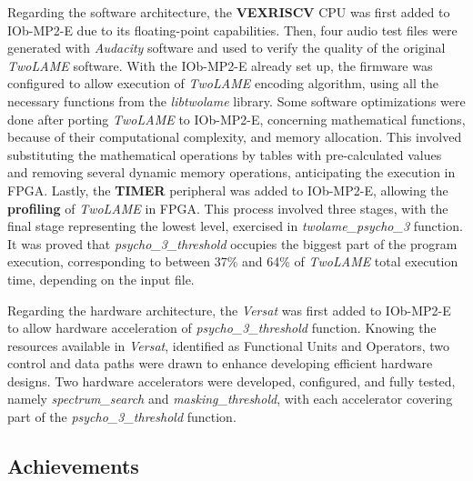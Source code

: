 Regarding the software architecture, the \textbf{VEXRISCV} CPU was first added to IOb-MP2-E due to its floating-point capabilities. Then, four audio test files were generated with \textit{Audacity} software and used to verify the quality of the original \textit{TwoLAME} software. 
With the IOb-MP2-E already set up, the firmware was configured to allow execution of \textit{TwoLAME} encoding algorithm, using all the necessary functions from the \textit{libtwolame} library. 
Some software optimizations were done after porting \textit{TwoLAME} to IOb-MP2-E, concerning mathematical functions, because of their computational complexity, and memory allocation. This involved substituting the mathematical operations by tables with pre-calculated values and removing several dynamic memory operations, anticipating the execution in FPGA. 
Lastly, the \textbf{TIMER} peripheral was added to IOb-MP2-E, allowing the \textbf{profiling} of \textit{TwoLAME} in FPGA. This process involved three stages, with the final stage representing the lowest level, exercised in \textit{twolame\_psycho\_3} function.
It was proved that \textit{psycho\_3\_threshold} occupies the biggest part of the program execution, corresponding to between 37\% and 64\% of \textit{TwoLAME} total execution time, depending on the input file.

Regarding the hardware architecture, the \textit{Versat} was first added to IOb-MP2-E to allow hardware acceleration of \textit{psycho\_3\_threshold} function.
Knowing the resources available in \textit{Versat}, identified as Functional Units and Operators, two control and data paths were drawn to enhance developing efficient hardware designs.
Two hardware accelerators were developed, configured, and fully tested, namely \textit{spectrum\_search} and \textit{masking\_threshold}, with each accelerator covering part of the \textit{psycho\_3\_threshold} function.

\subsection{Achievements}

